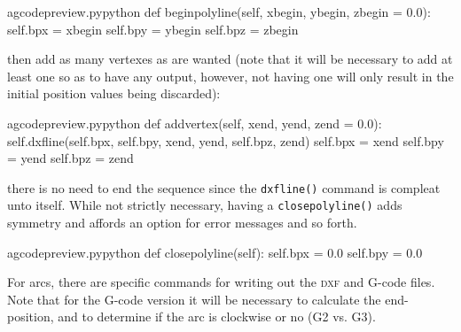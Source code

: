 \documentclass{ltxdoc}
\begin{document}
\lstset{firstnumber=\thegcpy}
\begin{writecode}{a}{gcodepreview.py}{python}
    def beginpolyline(self, xbegin, ybegin, zbegin = 0.0):
        self.bpx = xbegin
        self.bpy = ybegin
        self.bpz = zbegin

\end{writecode}
\addtocounter{gcpy}{5}

\noindent then add as many vertexes as are wanted (note that it will be necessary to add at least one so as to have any output, however, not having one will only result in the initial position values being discarded):

\begin{writecode}{a}{gcodepreview.py}{python}
    def addvertex(self, xend, yend, zend = 0.0):
        self.dxfline(self.bpx, self.bpy, xend, yend, self.bpz, zend)
        self.bpx = xend
        self.bpy = yend
        self.bpz = zend

\end{writecode}
\addtocounter{gcpy}{6}

\noindent there is no need to end the sequence since the \verb|dxfline()| command is compleat unto itself. While not strictly necessary, having a \verb|closepolyline()| adds symmetry and affords an option for error messages and so forth.

\begin{writecode}{a}{gcodepreview.py}{python}
    def closepolyline(self):
        self.bpx = 0.0
        self.bpy = 0.0

\end{writecode}
\addtocounter{gcpy}{4}

For arcs, there are specific commands for writing out the \textsc{dxf} and G-code files. Note that for the G-code version it will be necessary to calculate the end-position, and to determine if the arc is clockwise or no (G2 vs. G3).
\end{document}
